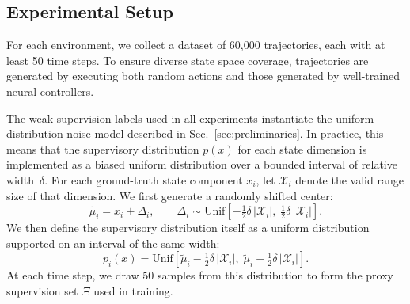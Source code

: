 \documentclass[nonacm,sigconf]{acmart}
\begin{document}
\subsection{Experimental Setup}\label{sec:setup}

For each environment, we collect a dataset of 60,000 trajectories, each with at least 50 time steps. To ensure diverse state space coverage, trajectories are generated by executing both random actions and those generated by well-trained neural controllers. 

The weak supervision labels used in all experiments instantiate the 
uniform-distribution noise model described in Sec.~\ref{sec:preliminaries}.  
In practice, this means that the supervisory distribution $p(x)$ for
each state dimension is implemented as a biased uniform distribution over a 
bounded interval of relative width~$\delta$.  For each ground-truth 
state component $x_i$, let $\mathcal{X}_i$ denote the valid 
range size of that dimension.  We first generate a randomly shifted 
center:
\[
\tilde{\mu}_i 
= x_i + \Delta_i,
\qquad 
\Delta_i \sim \mathrm{Unif}\!\left[
    -\tfrac{1}{2}\delta \,|\mathcal{X}_i|,\;
    \tfrac{1}{2}\delta \,|\mathcal{X}_i|
\right].
\]
We then define the supervisory distribution itself as a uniform
distribution supported on an interval of the same width:
\[
p_i(x) = \mathrm{Unif}\!\left[
\tilde{\mu}_i - \tfrac{1}{2}\delta\,|\mathcal{X}_i|,\;
\tilde{\mu}_i + \tfrac{1}{2}\delta\,|\mathcal{X}_i|
\right].
\]
At each time step, we draw $50$ samples from this distribution to form 
the proxy supervision set $\Xi$ used in training.





\end{document}
